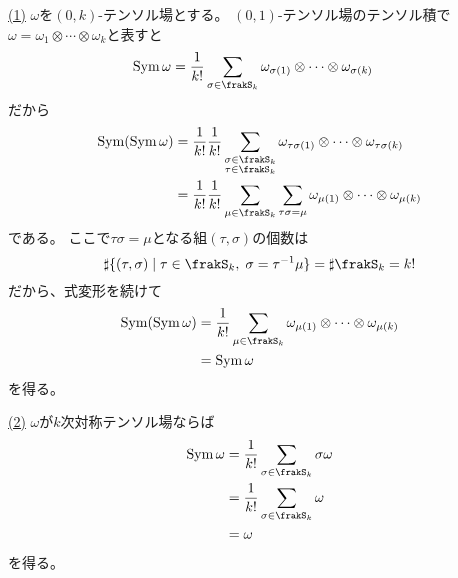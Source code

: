 \documentclass[report]{jlreq}
\begin{document}
\begin{answer}
    \uline{(1)} \quad
    $\omega$を$(0, k)$-テンソル場とする。
    $(0, 1)$-テンソル場のテンソル積で
    $\omega = \omega_1 \otimes \cdots \otimes \omega_k$と表すと
    \begin{alignat}{1}
        \Sym \omega
            &= \frac{1}{k!}
                \sum_{\sigma \in \frakS_k}
                \omega_{\sigma(1)} \otimes \cdots \otimes \omega_{\sigma(k)}
    \end{alignat}
    だから
    \begin{alignat}{1}
        \Sym(\Sym \omega)
            &= \frac{1}{k!} \frac{1}{k!}
                \sum_{\substack{
                    \sigma \in \frakS_k \\
                    \tau \in \frakS_k
                }}
                \omega_{\tau\sigma(1)} \otimes \cdots \otimes \omega_{\tau\sigma(k)} \\
            &= \frac{1}{k!} \frac{1}{k!}
                \sum_{\mu \in \frakS_k}
                \sum_{\tau \sigma = \mu}
                \omega_{\mu(1)} \otimes \cdots \otimes \omega_{\mu(k)}
    \end{alignat}
    である。
    ここで$\tau\sigma = \mu$となる組$(\tau, \sigma)$の個数は
    \begin{equation}
        \sharp\{
            (\tau, \sigma) \mid \tau \in \frakS_k, \; \sigma = \tau^{-1} \mu
        \}
            = \sharp \frakS_k
            = k!
    \end{equation}
    だから、式変形を続けて
    \begin{alignat}{1}
        \Sym(\Sym \omega)
            &= \frac{1}{k!}
                \sum_{\mu \in \frakS_k}
                \omega_{\mu(1)} \otimes \cdots \otimes \omega_{\mu(k)} \\
            &= \Sym \omega
    \end{alignat}
    を得る。

    \uline{(2)} \quad
    $\omega$が$k$次対称テンソル場ならば
    \begin{alignat}{1}
        \Sym \omega
            &= \frac{1}{k!}
                \sum_{\sigma \in \frakS_k}
                \sigma \omega \\
            &= \frac{1}{k!}
                \sum_{\sigma \in \frakS_k}
                \omega \\
            &= \omega
    \end{alignat}
    を得る。
\end{answer}

\end{document}
